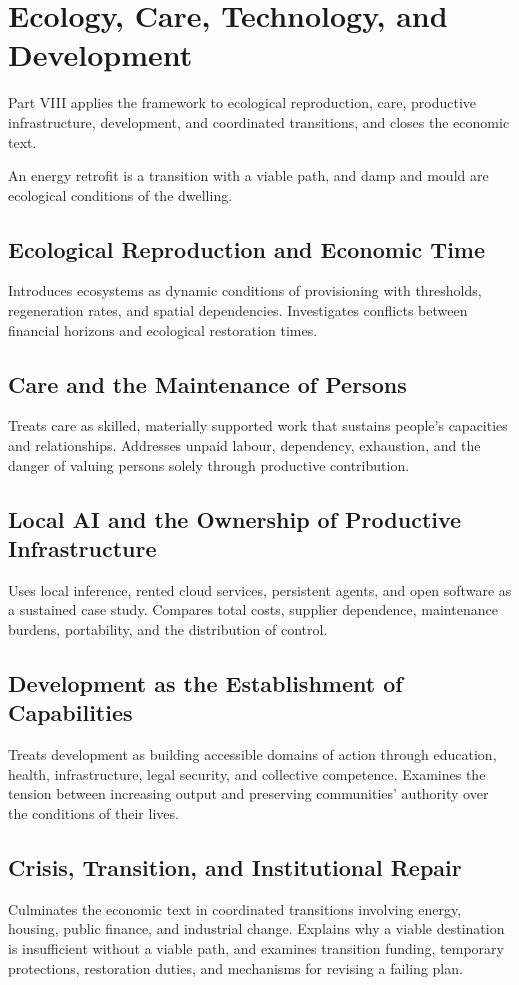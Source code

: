 \part{Ecology, Care, Technology, and Development}
\label{part:VIII}

Part VIII applies the framework to ecological reproduction, care, productive infrastructure, development, and coordinated transitions, and closes the economic text.

\begin{housing}An energy retrofit is a transition with a viable path, and damp and mould are ecological conditions of the dwelling.\end{housing}

\chapter{Ecological Reproduction and Economic Time}\label{ch:36}
Introduces ecosystems as dynamic conditions of provisioning with thresholds, regeneration rates, and spatial dependencies. Investigates conflicts between financial horizons and ecological restoration times.
\scaffold

\chapter{Care and the Maintenance of Persons}\label{ch:37}
Treats care as skilled, materially supported work that sustains people's capacities and relationships. Addresses unpaid labour, dependency, exhaustion, and the danger of valuing persons solely through productive contribution.
\scaffold

\chapter{Local AI and the Ownership of Productive Infrastructure}\label{ch:38}
Uses local inference, rented cloud services, persistent agents, and open software as a sustained case study. Compares total costs, supplier dependence, maintenance burdens, portability, and the distribution of control.
\scaffold

\chapter{Development as the Establishment of Capabilities}\label{ch:39}
Treats development as building accessible domains of action through education, health, infrastructure, legal security, and collective competence. Examines the tension between increasing output and preserving communities' authority over the conditions of their lives.
\scaffold

\chapter{Crisis, Transition, and Institutional Repair}\label{ch:40}
Culminates the economic text in coordinated transitions involving energy, housing, public finance, and industrial change. Explains why a viable destination is insufficient without a viable path, and examines transition funding, temporary protections, restoration duties, and mechanisms for revising a failing plan.
\scaffold
